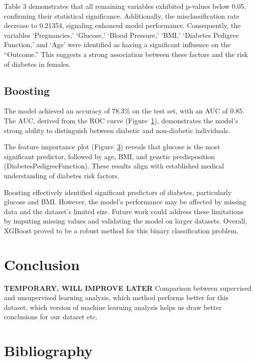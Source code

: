 \documentclass[12pt]{article}
\begin{document}
Table 3 demonstrates that all remaining variables exhibited p-values below 0.05, confirming their statistical significance. Additionally, the misclassification rate decrease to 0.21354, signaling enhanced model performance. Consequently, the variables ‘Pregnancies,’ ‘Glucose,’ ‘Blood Pressure,’ ‘BMI,’ ‘Diabetes Pedigree Function,’ and ‘Age’ were identified as having a significant influence on the “Outcome.” This suggests a strong association between these factors and the risk of diabetes in females.

\subsection{Boosting}

The model achieved an accuracy of 78.3\% on the test set, with an AUC of 0.85. The AUC, derived from the ROC curve (Figure~\ref{fig:roc}), demonstrates the model's strong ability to distinguish between diabetic and non-diabetic individuals.

The feature importance plot (Figure~\ref{fig:importance}) reveals that glucose is the most significant predictor, followed by age, BMI, and genetic predisposition (DiabetesPedigreeFunction). These results align with established medical understanding of diabetes risk factors.

\begin{figure}[h!]
	\centering
	\begin{subfigure}{0.45\textwidth}
		\caption{}
		\label{fig:roc}
	\end{subfigure}
	\hfill
	\begin{subfigure}{0.45\textwidth}
		\caption{}
		\label{fig:importance}
	\end{subfigure}
\end{figure}

Boosting effectively identified significant predictors of diabetes, particularly glucose and BMI. However, the model's performance may be affected by missing data and the dataset's limited size. Future work could address these limitations by imputing missing values and validating the model on larger datasets. Overall, XGBoost proved to be a robust method for this binary classification problem.

\section{Conclusion}

\textbf{TEMPORARY, WILL IMPROVE LATER} Comparison between supervised and unsupervised learning analysis, which method performs better for this dataset, which version of machine learning analysis helps us draw better conclusions for our dataset etc. 

 \section{Bibliography}
 
 
\end{document}
